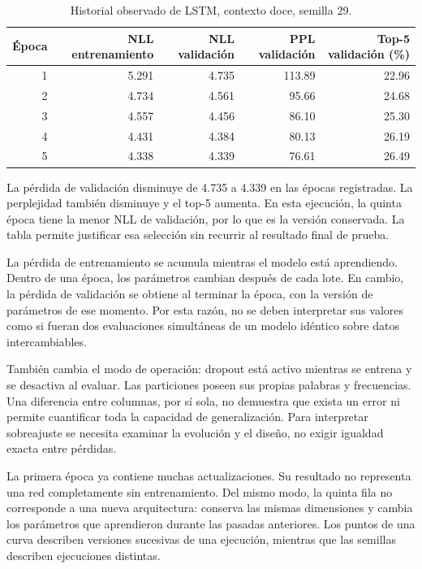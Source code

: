 \begin{table}[tb]
\caption{Historial observado de LSTM, contexto doce, semilla 29.}
\centering
\begin{tabular}{rrrrr}
\toprule Época & NLL entrenamiento & NLL validación & PPL validación & Top-5 validación (\%)\\\midrule
1 & 5.291 & 4.735 & 113.89 & 22.96\\
2 & 4.734 & 4.561 & 95.66 & 24.68\\
3 & 4.557 & 4.456 & 86.10 & 25.30\\
4 & 4.431 & 4.384 & 80.13 & 26.19\\
5 & 4.338 & 4.339 & 76.61 & 26.49\\\bottomrule
\end{tabular}
\end{table}

La pérdida de validación disminuye de 4.735 a 4.339 en las épocas registradas. La perplejidad también disminuye y el top-5 aumenta. En esta ejecución, la quinta época tiene la menor NLL de validación, por lo que es la versión conservada. La tabla permite justificar esa selección sin recurrir al resultado final de prueba.

La pérdida de entrenamiento se acumula mientras el modelo está aprendiendo. Dentro de una época, los parámetros cambian después de cada lote. En cambio, la pérdida de validación se obtiene al terminar la época, con la versión de parámetros de ese momento. Por esta razón, no se deben interpretar sus valores como si fueran dos evaluaciones simultáneas de un modelo idéntico sobre datos intercambiables.

También cambia el modo de operación: dropout está activo mientras se entrena y se desactiva al evaluar. Las particiones poseen sus propias palabras y frecuencias. Una diferencia entre columnas, por sí sola, no demuestra que exista un error ni permite cuantificar toda la capacidad de generalización. Para interpretar sobreajuste se necesita examinar la evolución y el diseño, no exigir igualdad exacta entre pérdidas.

La primera época ya contiene muchas actualizaciones. Su resultado no representa una red completamente sin entrenamiento. Del mismo modo, la quinta fila no corresponde a una nueva arquitectura: conserva las mismas dimensiones y cambia los parámetros que aprendieron durante las pasadas anteriores. Los puntos de una curva describen versiones sucesivas de una ejecución, mientras que las semillas describen ejecuciones distintas.

